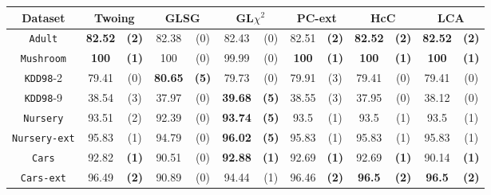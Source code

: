 \begin{table}
\scriptsize
\centering
\begin{tabular}{c|cc|cc|cc|cc|cc|cc} 
Dataset             & \multicolumn{2}{c|}{Twoing} &  \multicolumn{2}{c|}{GLSG}  & \multicolumn{2}{c|}{GL$\chi^2$} & \multicolumn{2}{c|}{PC-ext}& \multicolumn{2}{c|}{HcC}& \multicolumn{2}{c}{LCA}\\
\hline
{\tt Adult}         &  {\bf 82.52} & {\bf (2)}    &  82.38       & (0)          &  82.43       & (0)              & 82.51      & {\bf (2)}    & {\bf 82.52}& {\bf (2)}  & {\bf 82.52}& {\bf (2)}  \\
{\tt Mushroom}      &  {\bf 100}   & {\bf (1)}    &  100         & (0)          &  99.99       & (0)              & {\bf 100 } & {\bf (1)}    & {\bf 100}  & {\bf (1)}  & {\bf 100}  & {\bf (1)}  \\
{\tt KDD98}-2       &  79.41       & (0)          &  {\bf 80.65} & {\bf (5)}    &  79.73       & (0)              & 79.91      & (3)          & 79.41      & (0)        & 79.41      & (0)        \\
{\tt KDD98}-9       &  38.54       & (3)          &  37.97       & (0)          &  {\bf 39.68} & {\bf (5)}        & 38.55      & (3)          & 37.95      & (0)        & 38.12      & (0)        \\
{\tt Nursery}       &  93.51       & (2)          &  92.39       & (0)          &  {\bf 93.74} & {\bf (5)}        & 93.5       & (1)          & 93.5       & (1)        & 93.5       & (1)        \\
{\tt Nursery-ext}   &  95.83       & (1)          &  94.79       & (0)          &  {\bf 96.02} & {\bf (5)}        & 95.83      & (1)          & 95.83      & (1)        & 95.83      & (1)        \\
{\tt Cars}          &  92.82       & {\bf (1)}    &  90.51       & (0)          &  {\bf 92.88} & {\bf (1)}        & 92.69      & {\bf (1)}    & 92.69      & {\bf (1)}  & 90.14      & {\bf (1)}  \\
{\tt Cars-ext}      &  96.49       & {\bf (2)}    &  90.89       & (0)          &  94.44       & (1)              & 96.46      & {\bf (2)}    & {\bf 96.5} & {\bf (2)}  & {\bf 96.5} & {\bf (2)}  \\

\end{tabular}
\end{table}

